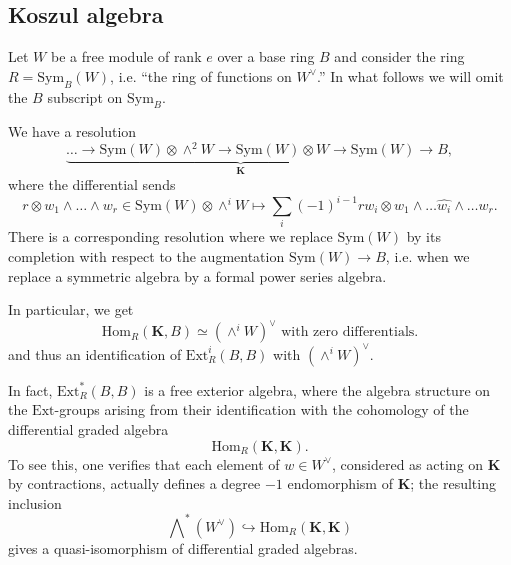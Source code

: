 \documentclass[10pt]{amsart}
\newcommand{\Ext}{\mathrm{Ext}}
\newcommand{\Hom}{\mathrm{Hom}}
\newcommand{\Sym}{\mathrm{Sym}}
\theoremstyle{remark}
\begin{document}
\subsection{Koszul algebra}  \label{KA1} 
  Let $W$ be a free module of rank $e$ over a base ring   
  $B$    and consider the ring $ R= \mathrm{Sym}_B(W)$, i.e. ``the ring of functions on $W^{\vee}$.''     In what follows
  we will omit the $B$ subscript on $\mathrm{Sym}_B$. 
  
   We have a resolution 
  $$\underbrace{ \dots \rightarrow \Sym(W)  \otimes \wedge^2 W \rightarrow  \Sym(W) \otimes W  \rightarrow \Sym(W)}_{\mathbf{K}} \rightarrow  B,$$
where the differential sends 
  $$ r \otimes w_1 \wedge \dots \wedge w_r  \in \Sym(W) \otimes \wedge^i W  \mapsto \sum_{i} (-1)^{i-1}  r w_i \otimes w_1\wedge \dots \widehat{w_i} \wedge \dots w_r .$$
 There is a corresponding resolution where we replace
 $\Sym(W)$ by its completion with respect to the augmentation $\Sym(W) \rightarrow B$, i.e.
 when we replace a symmetric algebra by a formal power series algebra. 
 
 In particular, we get
 $$\Hom_{R} (\mathbf{K}, B) \simeq  \left( \wedge^i W \right)^{\vee} \mbox{ with zero differentials.}$$
 and thus an identification of  $\Ext^i_R(B, B)$ with $ \left( \wedge^i W \right)^{\vee} $. 
 
 In fact, $\Ext^*_R(B, B)$ is a free exterior algebra, where  the algebra structure on the $\Ext$-groups arising from their identification with the cohomology of the differential graded algebra 
  $$\Hom_{R} (\mathbf{K}, \mathbf{K}).$$
  To see this, one verifies 
    that  each element of $w \in W^{\vee}$, considered
  as acting on $\mathbf{K}$ by contractions, actually defines a degree $-1$  endomorphism of $\mathbf{K}$;
   the resulting inclusion 
  $$\bigwedge \nolimits^{*}(W^{\vee}) \hookrightarrow \Hom_R(\mathbf{K}, \mathbf{K})$$ 
  gives a quasi-isomorphism of differential graded algebras. 
 

\end{document}
